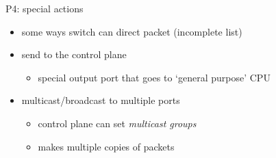 \begin{frame}[fragile]{P4: special actions}
    \begin{itemize}
    \item some ways switch can direct packet (incomplete list)
    \vspace{.5cm}
    \item send to the control plane
        \begin{itemize}
        \item special output port that goes to `general purpose' CPU
        \end{itemize}
    \item multicast/broadcast to multiple ports
        \begin{itemize}
        \item control plane can set \textit{multicast groups}
        \item makes multiple copies of packets
        \end{itemize}
    \end{itemize}
\end{frame}

